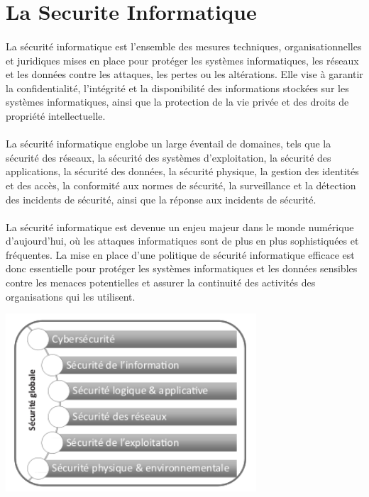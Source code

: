  \section{La Securite Informatique }


\paragraph{ }  La sécurité informatique est l'ensemble des mesures techniques, organisationnelles et juridiques mises en place pour protéger les systèmes informatiques, les réseaux et les données contre les attaques, les pertes ou les altérations. Elle vise à garantir la confidentialité, l'intégrité et la disponibilité des informations stockées sur les systèmes informatiques, ainsi que la protection de la vie privée et des droits de propriété intellectuelle.  

\paragraph{ } La sécurité informatique englobe un large éventail de domaines, tels que la sécurité des réseaux, la sécurité des systèmes d'exploitation, la sécurité des applications, la sécurité des données, la sécurité physique, la gestion des identités et des accès, la conformité aux normes de sécurité, la surveillance et la détection des incidents de sécurité, ainsi que la réponse aux incidents de sécurité.

\paragraph{ }  La sécurité informatique est devenue un enjeu majeur dans le monde numérique d’aujourd’hui, où les attaques informatiques sont de plus en plus sophistiquées et fréquentes. La mise en place d'une politique de sécurité informatique efficace est donc essentielle pour protéger les systèmes informatiques et les données sensibles contre les menaces potentielles et assurer la continuité des activités des organisations qui les utilisent.
\pagebreak

\hbox{\includegraphics[width=0.7\textwidth]{PhotoMemoire/image_sec.png}}
